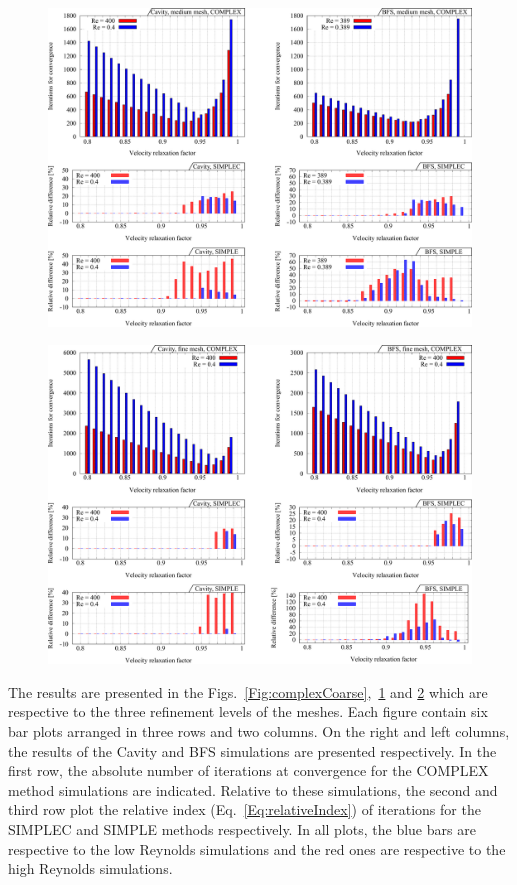 \documentclass[final,3p,times,11pt,onecolumn]{myElsarticle}
\numberwithin{equation}{section}
\begin{document}
\begin{figure}[t!]
\centering
\includegraphics[width=17cm]{fig/Results/complexMedium.pdf}
\caption{}
\label{Fig:complexMedium}
\end{figure}

\begin{figure}[t!]
\centering
\includegraphics[width=17cm]{fig/Results/complexFine.pdf}
\caption{}
\label{Fig:complexFine}
\end{figure}

The results are presented in the Figs.~\ref{Fig:complexCoarse},~\ref{Fig:complexMedium} and \ref{Fig:complexFine} which are respective to the three refinement levels of the meshes. Each figure contain six bar plots arranged in three rows and two columns. On the right and left columns, the results of the Cavity and BFS simulations are presented respectively. In the first row, the absolute number of iterations at convergence for the COMPLEX method simulations are indicated. Relative to these simulations, the second and third row plot the relative index (Eq.~\ref{Eq:relativeIndex}) of iterations for the SIMPLEC and SIMPLE methods respectively. In all plots, the blue bars are respective to the low Reynolds simulations and the red ones are respective to the high Reynolds simulations.   
\end{document}
